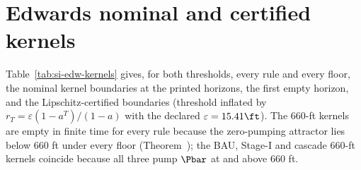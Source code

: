 \section{Edwards nominal and certified kernels}\label{si:edw-kernels}
Table~\ref{tab:si-edw-kernels} gives, for both thresholds, every rule and every floor, the nominal kernel boundaries at the printed horizons, the first empty horizon, and the Lipschitz-certified boundaries (threshold inflated by $r_T=\varepsilon(1-a^T)/(1-a)$ with the declared $\varepsilon=15.41\ft$). The 660-ft kernels are empty in finite time for every rule because the zero-pumping attractor lies below 660 ft under every floor (Theorem~); the BAU, Stage-I and cascade 660-ft kernels coincide because all three pump $\Pbar$ at and above 660 ft.


